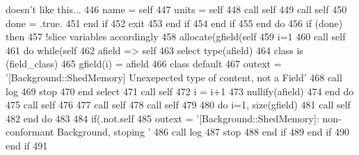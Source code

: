 \begin{DoxyCode}
{       doesn't like this...}
446                         name = self%
447                         units = self%
448                         \textcolor{keyword}{call }self%
449                         \textcolor{keyword}{call }self%
450                         done  = .true.
451 \textcolor{keywordflow}{                    end if}
452                     \textcolor{keywordflow}{exit}
453 \textcolor{keywordflow}{                end if}
454 \textcolor{keywordflow}{            end if}
455 \textcolor{keywordflow}{        end do}
456         \textcolor{keywordflow}{if} (done) \textcolor{keywordflow}{then}
457             \textcolor{comment}{!slice variables accordingly}
458             \textcolor{keyword}{allocate}(gfield(self%
459             i=1
460             \textcolor{keyword}{call }self%
461             \textcolor{keywordflow}{do} \textcolor{keywordflow}{while}(self%
462                 afield => self%
463                 \textcolor{keywordflow}{select type}(afield)
464 \textcolor{keywordflow}{                class is} (field\_class)
465                     gfield(i) = afield%
466 \textcolor{keywordflow}{                    class default}
467                     outext = \textcolor{stringliteral}{'[Background::ShedMemory] Unexepected type of content, not a Field'}
468                     \textcolor{keyword}{call }log%
469                     stop
470 \textcolor{keywordflow}{                end select}
471                 \textcolor{keyword}{call }self%
472                 i = i+1
473                 \textcolor{keyword}{nullify}(afield)
474 \textcolor{keywordflow}{            end do}
475             \textcolor{keyword}{call }self%
476 
477             \textcolor{keyword}{call }self%
478             \textcolor{keyword}{call }self%
479 
480             \textcolor{keywordflow}{do} i=1, \textcolor{keyword}{size}(gfield)
481                 \textcolor{keyword}{call }self%
482 \textcolor{keywordflow}{            end do}
483 
484             \textcolor{keywordflow}{if}(.not.self%
485                 outext = \textcolor{stringliteral}{'[Background::ShedMemory]: non-conformant Background, stoping '}
486                 \textcolor{keyword}{call }log%
487                 stop
488 \textcolor{keywordflow}{            end if}
489 \textcolor{keywordflow}{        end if}
490 \textcolor{keywordflow}{    end if}
491 
\end{DoxyCode}
\mbox{\label{namespacebackground__mod_a3cee95b9b5d3aae83df33334981f2b27}} 
